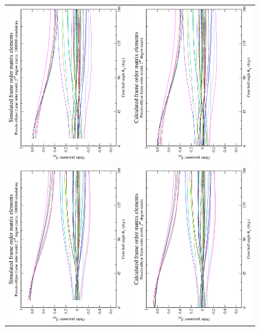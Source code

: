 \begin{figure}
\centering
  \begin{tabular}{@{}cc@{}}
    \includegraphics[width=.35\textwidth,angle=270]{images/frame_order_matrix/Sijkl_pseudo-ellipse_out_of_frame_theta_x_ens1000000.eps} &
    \includegraphics[width=.35\textwidth,angle=270]{images/frame_order_matrix/Sijkl_pseudo-ellipse_out_of_frame_theta_x_calc.eps} \\
    \\[-5pt]
    \includegraphics[width=.35\textwidth,angle=270]{images/frame_order_matrix/Sijkl_pseudo-ellipse_out_of_frame_theta_y_ens1000000.eps} &
    \includegraphics[width=.35\textwidth,angle=270]{images/frame_order_matrix/Sijkl_pseudo-ellipse_out_of_frame_theta_y_calc.eps} \\

\end{tabular}
\end{figure}
